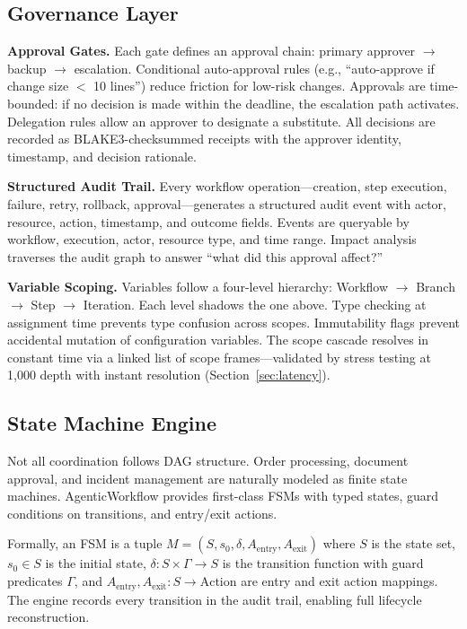 \documentclass[10pt, twocolumn]{article}
\begin{document}
\subsection{Governance Layer}\label{sec:governance}

\textbf{Approval Gates.} Each gate defines an approval chain: primary approver $\to$ backup $\to$ escalation. Conditional auto-approval rules (e.g., ``auto-approve if change size $<$ 10 lines'') reduce friction for low-risk changes. Approvals are time-bounded: if no decision is made within the deadline, the escalation path activates. Delegation rules allow an approver to designate a substitute. All decisions are recorded as BLAKE3-checksummed receipts with the approver identity, timestamp, and decision rationale.

\textbf{Structured Audit Trail.} Every workflow operation---creation, step execution, failure, retry, rollback, approval---generates a structured audit event with actor, resource, action, timestamp, and outcome fields. Events are queryable by workflow, execution, actor, resource type, and time range. Impact analysis traverses the audit graph to answer ``what did this approval affect?''

\textbf{Variable Scoping.} Variables follow a four-level hierarchy: Workflow $\to$ Branch $\to$ Step $\to$ Iteration. Each level shadows the one above. Type checking at assignment time prevents type confusion across scopes. Immutability flags prevent accidental mutation of configuration variables. The scope cascade resolves in constant time via a linked list of scope frames---validated by stress testing at 1{,}000 depth with instant resolution (Section~\ref{sec:latency}).

\subsection{State Machine Engine}\label{sec:fsm}

Not all coordination follows DAG structure. Order processing, document approval, and incident management are naturally modeled as finite state machines. AgenticWorkflow provides first-class FSMs with typed states, guard conditions on transitions, and entry/exit actions.

Formally, an FSM is a tuple $M = (S, s_0, \delta, A_{\text{entry}}, A_{\text{exit}})$ where $S$ is the state set, $s_0 \in S$ is the initial state, $\delta: S \times \Gamma \to S$ is the transition function with guard predicates $\Gamma$, and $A_{\text{entry}}, A_{\text{exit}}: S \to \text{Action}$ are entry and exit action mappings. The engine records every transition in the audit trail, enabling full lifecycle reconstruction.
\end{document}

